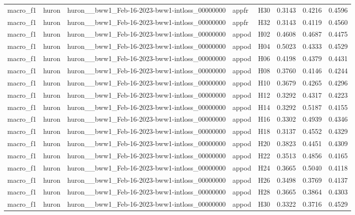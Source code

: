 \begin{table}[tbp]
\begin{tabular}{lllllrrr}
macro\_f1 & huron & huron\_\_bww1\_Feb-16-2023-bww1-intloss\_00000000 & appfr & H30 & 0.3143 & 0.4216 & 0.4596 \\
macro\_f1 & huron & huron\_\_bww1\_Feb-16-2023-bww1-intloss\_00000000 & appfr & H32 & 0.3143 & 0.4119 & 0.4560 \\
macro\_f1 & huron & huron\_\_bww1\_Feb-16-2023-bww1-intloss\_00000000 & appod & H02 & 0.4608 & 0.4687 & 0.4475 \\
macro\_f1 & huron & huron\_\_bww1\_Feb-16-2023-bww1-intloss\_00000000 & appod & H04 & 0.5023 & 0.4333 & 0.4529 \\
macro\_f1 & huron & huron\_\_bww1\_Feb-16-2023-bww1-intloss\_00000000 & appod & H06 & 0.4198 & 0.4379 & 0.4431 \\
macro\_f1 & huron & huron\_\_bww1\_Feb-16-2023-bww1-intloss\_00000000 & appod & H08 & 0.3760 & 0.4146 & 0.4244 \\
macro\_f1 & huron & huron\_\_bww1\_Feb-16-2023-bww1-intloss\_00000000 & appod & H10 & 0.3679 & 0.4265 & 0.4296 \\
macro\_f1 & huron & huron\_\_bww1\_Feb-16-2023-bww1-intloss\_00000000 & appod & H12 & 0.3292 & 0.4317 & 0.4223 \\
macro\_f1 & huron & huron\_\_bww1\_Feb-16-2023-bww1-intloss\_00000000 & appod & H14 & 0.3292 & 0.5187 & 0.4155 \\
macro\_f1 & huron & huron\_\_bww1\_Feb-16-2023-bww1-intloss\_00000000 & appod & H16 & 0.3302 & 0.4939 & 0.4346 \\
macro\_f1 & huron & huron\_\_bww1\_Feb-16-2023-bww1-intloss\_00000000 & appod & H18 & 0.3137 & 0.4552 & 0.4329 \\
macro\_f1 & huron & huron\_\_bww1\_Feb-16-2023-bww1-intloss\_00000000 & appod & H20 & 0.3823 & 0.4451 & 0.4309 \\
macro\_f1 & huron & huron\_\_bww1\_Feb-16-2023-bww1-intloss\_00000000 & appod & H22 & 0.3513 & 0.4856 & 0.4165 \\
macro\_f1 & huron & huron\_\_bww1\_Feb-16-2023-bww1-intloss\_00000000 & appod & H24 & 0.3665 & 0.5040 & 0.4118 \\
macro\_f1 & huron & huron\_\_bww1\_Feb-16-2023-bww1-intloss\_00000000 & appod & H26 & 0.3498 & 0.3769 & 0.4137 \\
macro\_f1 & huron & huron\_\_bww1\_Feb-16-2023-bww1-intloss\_00000000 & appod & H28 & 0.3665 & 0.3864 & 0.4303 \\
macro\_f1 & huron & huron\_\_bww1\_Feb-16-2023-bww1-intloss\_00000000 & appod & H30 & 0.3322 & 0.3716 & 0.4529 \\

\end{tabular}
\end{table}

